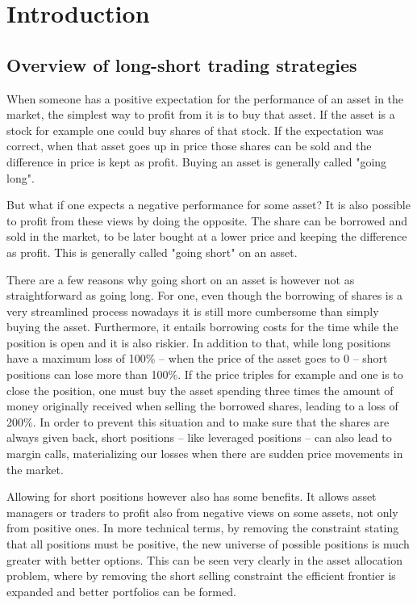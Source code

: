 \section{Introduction}
\subsection{Overview of long-short trading strategies}
When someone has a positive expectation for the performance of an asset in the market, the simplest way to profit from it is to buy that asset. If the asset is a stock for example one could buy shares of that stock. If the expectation was correct, when that asset goes up in price those shares can be sold and the difference in price is kept as profit. Buying an asset is generally called "going long".

But what if one expects a negative performance for some asset? It is also possible to profit from these views by doing the opposite. The share can be borrowed and sold in the market, to be later bought at a lower price and keeping the difference as profit. This is generally called "going short" on an asset.

There are a few reasons why going short on an asset is however not as straightforward as going long. For one, even though the borrowing of shares is a very streamlined process nowadays it is still more cumbersome than simply buying the asset. Furthermore, it entails borrowing costs for the time while the position is open and it is also riskier. In addition to that, while long positions have a maximum loss of 100\% -- when the price of the asset goes to 0 -- short positions can lose more than 100\%. If the price triples for example and one is to close the position, one must buy the asset spending three times the amount of money originally received when selling the borrowed shares, leading to a loss of 200\%. In order to prevent this situation and to make sure that the shares are always given back, short positions -- like leveraged positions --  can also lead to margin calls, materializing our losses when there are sudden price movements in the market.

Allowing for short positions however also has some benefits. It allows asset managers or traders to profit also from negative views on some assets, not only from positive ones. In more technical terms, by removing the constraint stating that all positions must be positive, the new universe of possible positions is much greater with better options. This can be seen very clearly in the asset allocation problem, where by removing the short selling constraint the efficient frontier is expanded and better portfolios can be formed. 

